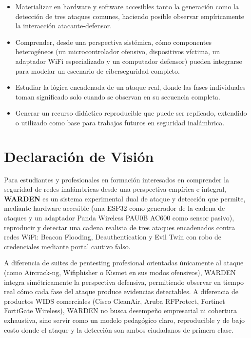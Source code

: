 \documentclass[11pt,a4paper]{article}
\begin{document}
\begin{itemize}
  \item Materializar en hardware y software accesibles tanto la generación
    como la detección de tres ataques comunes, haciendo posible observar
    empíricamente la interacción atacante-defensor.
  \item Comprender, desde una perspectiva sistémica, cómo componentes
    heterogéneos (un microcontrolador ofensivo, dispositivos víctima, un
    adaptador WiFi especializado y un computador defensor) pueden integrarse
    para modelar un escenario de ciberseguridad completo.
  \item Estudiar la lógica encadenada de un ataque real, donde las fases
    individuales toman significado solo cuando se observan en su secuencia
    completa.
  \item Generar un recurso didáctico reproducible que puede ser replicado,
    extendido o utilizado como base para trabajos futuros en seguridad
    inalámbrica.
\end{itemize}

\section{Declaración de Visión}

Para estudiantes y profesionales en formación interesados en comprender la
seguridad de redes inalámbricas desde una perspectiva empírica e integral,
\textbf{WARDEN} es un sistema experimental dual de ataque y detección que
permite, mediante hardware accesible (una ESP32 como generador de la cadena
de ataques y un adaptador Panda Wireless PAU0B AC600 como sensor pasivo),
reproducir y detectar una cadena realista de tres ataques encadenados contra
redes WiFi: Beacon Flooding, Deauthentication y Evil Twin con robo de
credenciales mediante portal cautivo falso.

A diferencia de suites de pentesting profesional orientadas únicamente al
ataque (como Aircrack-ng, Wifiphisher o Kismet en sus modos ofensivos),
WARDEN integra simétricamente la perspectiva defensiva, permitiendo observar
en tiempo real cómo cada fase del ataque produce evidencias detectables. A
diferencia de productos WIDS comerciales (Cisco CleanAir, Aruba RFProtect,
Fortinet FortiGate Wireless), WARDEN no busca desempeño empresarial ni
cobertura exhaustiva, sino servir como un modelo pedagógico claro,
reproducible y de bajo costo donde el ataque y la detección son ambos
ciudadanos de primera clase.
\end{document}
